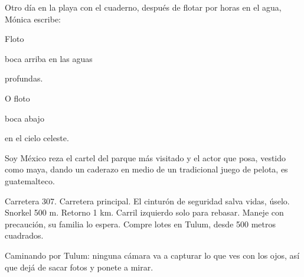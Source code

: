 \documentclass[12pt,twoside,openright,a5paper]{book}
\begin{document}
Otro día en la playa con el cuaderno, después de
flotar por horas en el agua, Mónica escribe:

\vspace{0.5cm}

Floto

boca arriba en las aguas

profundas.

O floto

boca abajo

en el cielo celeste.

\vspace{0.5cm}

\hrulefill\hspace{0.2cm} \decofourleft\decofourright \hspace{0.2cm} \hrulefill
\vspace{0.5cm}

Soy México reza el cartel del parque más visitado y el actor que posa,
vestido como maya, dando un caderazo en medio de un tradicional juego de
pelota, es guatemalteco.

\vspace{0.5cm}

\hrulefill\hspace{0.2cm} \decofourleft\decofourright \hspace{0.2cm} \hrulefill
\vspace{0.5cm}

Carretera 307. Carretera principal. El cinturón de seguridad salva
vidas, úselo. Snorkel 500  m. Retorno 1 km. Carril izquierdo solo para
rebasar. Maneje con precaución, su familia lo espera. Compre lotes en Tulum,
desde 500 metros cuadrados.

\vspace{0.5cm}

\hrulefill\hspace{0.2cm} \decofourleft\decofourright \hspace{0.2cm} \hrulefill
\vspace{0.5cm}

Caminando por Tulum: ninguna cámara va a capturar lo que ves con los ojos,
así que dejá de sacar fotos y ponete a mirar.

\vspace{0.5cm}

\hrulefill\hspace{0.2cm} \decofourleft\decofourright \hspace{0.2cm} \hrulefill
\vspace{0.5cm}
\end{document}
